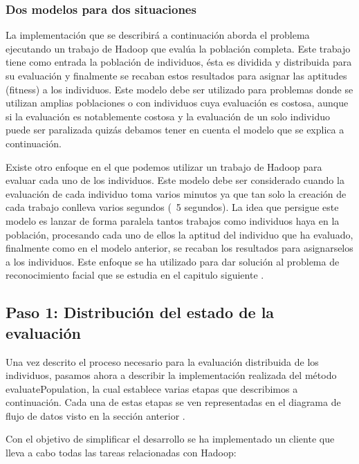 \subsubsection{Dos modelos para dos situaciones}\label{dos-modelos-para-dos-situaciones}

La implementación que se describirá a continuación aborda el problema ejecutando un trabajo de Hadoop que evalúa la población completa. Este trabajo tiene como entrada la población de individuos, \'esta es dividida y distribuida para su evaluación y finalmente se recaban estos resultados para asignar  las aptitudes (fitness) a los individuos. Este modelo debe ser utilizado para problemas donde se utilizan amplias poblaciones o con individuos cuya evaluación es costosa, aunque si la evaluación es notablemente costosa y la evaluación de un solo individuo puede ser paralizada quizás debamos tener en cuenta el modelo que se explica a continuación.

Existe otro enfoque en el que podemos utilizar un trabajo de Hadoop para evaluar cada uno de los individuos. Este modelo debe ser considerado cuando la evaluación de cada individuo toma varios minutos ya que tan solo la creación de cada trabajo conlleva varios segundos (~5 segundos). La idea que persigue este modelo es lanzar de forma paralela tantos trabajos como individuos haya en la población, procesando cada uno de ellos la aptitud del individuo que ha evaluado, finalmente como en el modelo anterior, se recaban los resultados para asignarselos a los individuos. Este enfoque se ha utilizado para dar solución al problema de reconocimiento facial que se estudia en el capitulo siguiente .

\subsection{Paso 1: Distribución del estado de la evaluación}

Una vez descrito el proceso necesario para la evaluación distribuida de los individuos, pasamos ahora a describir la implementación realizada del método evaluatePopulation, la cual establece varias etapas que describimos a continuación. Cada una de estas etapas se ven representadas en el diagrama de flujo de datos visto en la sección anterior .

Con el objetivo de simplificar el desarrollo se ha implementado un cliente que lleva a cabo todas las tareas relacionadas con Hadoop:

